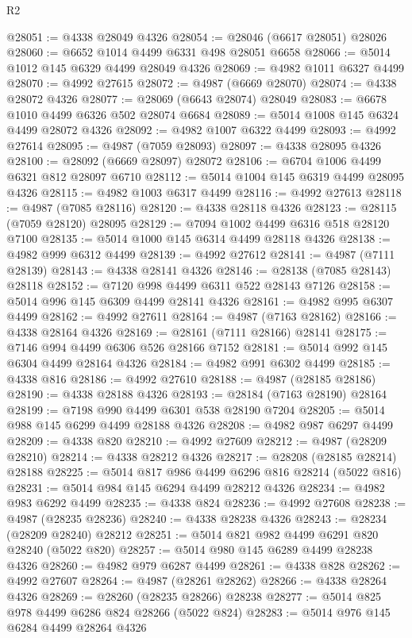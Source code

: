 \begin{lexlean}{R2}
\begin{coremodule}
@28051 := @4338 @28049 @4326
@28054 := @28046 (@6617 @28051) @28026
@28060 := @6652 @1014 @4499 @6331 @498 @28051 @6658
@28066 := @5014 @1012 @145 @6329 @4499 @28049 @4326
@28069 := @4982 @1011 @6327 @4499
@28070 := @4992 @27615
@28072 := @4987 (@6669 @28070)
@28074 := @4338 @28072 @4326
@28077 := @28069 (@6643 @28074) @28049
@28083 := @6678 @1010 @4499 @6326 @502 @28074 @6684
@28089 := @5014 @1008 @145 @6324 @4499 @28072 @4326
@28092 := @4982 @1007 @6322 @4499
@28093 := @4992 @27614
@28095 := @4987 (@7059 @28093)
@28097 := @4338 @28095 @4326
@28100 := @28092 (@6669 @28097) @28072
@28106 := @6704 @1006 @4499 @6321 @812 @28097 @6710
@28112 := @5014 @1004 @145 @6319 @4499 @28095 @4326
@28115 := @4982 @1003 @6317 @4499
@28116 := @4992 @27613
@28118 := @4987 (@7085 @28116)
@28120 := @4338 @28118 @4326
@28123 := @28115 (@7059 @28120) @28095
@28129 := @7094 @1002 @4499 @6316 @518 @28120 @7100
@28135 := @5014 @1000 @145 @6314 @4499 @28118 @4326
@28138 := @4982 @999 @6312 @4499
@28139 := @4992 @27612
@28141 := @4987 (@7111 @28139)
@28143 := @4338 @28141 @4326
@28146 := @28138 (@7085 @28143) @28118
@28152 := @7120 @998 @4499 @6311 @522 @28143 @7126
@28158 := @5014 @996 @145 @6309 @4499 @28141 @4326
@28161 := @4982 @995 @6307 @4499
@28162 := @4992 @27611
@28164 := @4987 (@7163 @28162)
@28166 := @4338 @28164 @4326
@28169 := @28161 (@7111 @28166) @28141
@28175 := @7146 @994 @4499 @6306 @526 @28166 @7152
@28181 := @5014 @992 @145 @6304 @4499 @28164 @4326
@28184 := @4982 @991 @6302 @4499
@28185 := @4338 @816
@28186 := @4992 @27610
@28188 := @4987 (@28185 @28186)
@28190 := @4338 @28188 @4326
@28193 := @28184 (@7163 @28190) @28164
@28199 := @7198 @990 @4499 @6301 @538 @28190 @7204
@28205 := @5014 @988 @145 @6299 @4499 @28188 @4326
@28208 := @4982 @987 @6297 @4499
@28209 := @4338 @820
@28210 := @4992 @27609
@28212 := @4987 (@28209 @28210)
@28214 := @4338 @28212 @4326
@28217 := @28208 (@28185 @28214) @28188
@28225 := @5014 @817 @986 @4499 @6296 @816 @28214 (@5022 @816)
@28231 := @5014 @984 @145 @6294 @4499 @28212 @4326
@28234 := @4982 @983 @6292 @4499
@28235 := @4338 @824
@28236 := @4992 @27608
@28238 := @4987 (@28235 @28236)
@28240 := @4338 @28238 @4326
@28243 := @28234 (@28209 @28240) @28212
@28251 := @5014 @821 @982 @4499 @6291 @820 @28240 (@5022 @820)
@28257 := @5014 @980 @145 @6289 @4499 @28238 @4326
@28260 := @4982 @979 @6287 @4499
@28261 := @4338 @828
@28262 := @4992 @27607
@28264 := @4987 (@28261 @28262)
@28266 := @4338 @28264 @4326
@28269 := @28260 (@28235 @28266) @28238
@28277 := @5014 @825 @978 @4499 @6286 @824 @28266 (@5022 @824)
@28283 := @5014 @976 @145 @6284 @4499 @28264 @4326

\end{coremodule}
\end{lexlean}
